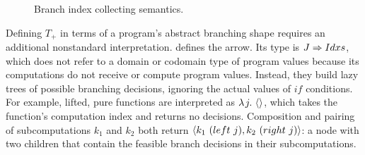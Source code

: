 \begin{figure}[!tb]

\caption[Branch index collecting semantics]{Branch index collecting semantics.}
\label{fig:collecting-semantics}
\end{figure}

Defining $T_+$ in terms of a program's abstract branching shape requires an additional nonstandard interpretation.
 defines the  arrow.
Its type is $J \Rightarrow Idxs$, which does not refer to a domain or codomain type of program values because its computations do not receive or compute program values.
Instead, they build lazy trees of possible branching decisions, ignoring the actual values of $if$ conditions.
For example, lifted, pure functions are interpreted as $\lambda\mspace{2mu}{j}\ldotp\, \langle{}\rangle$, which takes the function's computation index and returns no decisions.
Composition and pairing of subcomputations $k_1$ and $k_2$ both return $\langle{k_1~(left~j),k_2~(right~j)}\rangle$: a node with two children that contain the feasible branch decisions in their subcomputations.

